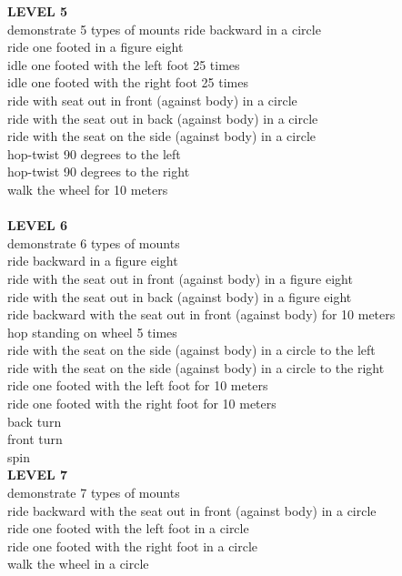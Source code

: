 \begin{multicols}{2}
\textbf{LEVEL 5}\\
demonstrate 5 types of mounts ride backward in a circle\\
ride one footed in a figure eight\\
idle one footed with the left foot 25 times\\
idle one footed with the right foot 25 times\\
ride with seat out in front (against body) in a circle\\
ride with the seat out in back (against body) in a circle\\
ride with the seat on the side (against body) in a circle\\
hop-twist 90 degrees to the left\\
hop-twist 90 degrees to the right\\
walk the wheel for 10 meters \\
\\
\textbf{LEVEL 6}\\
demonstrate 6 types of mounts\\
ride backward in a figure eight\\
ride with the seat out in front (against body) in a figure eight\\
ride with the seat out in back (against body) in a figure eight\\
ride backward with the seat out in front (against body) for 10 meters\\
hop standing on wheel 5 times\\
ride with the seat on the side (against body) in a circle to the left\\
ride with the seat on the side (against body) in a circle to the right\\
ride one footed with the left foot for 10 meters\\
ride one footed with the right foot for 10 meters\\
back turn\\
front turn\\
spin \\
\newpage
\textbf{LEVEL 7}\\
demonstrate 7 types of mounts\\
ride backward with the seat out in front (against body) in a circle\\
ride one footed with the left foot in a circle\\
ride one footed with the right foot in a circle\\
walk the wheel in a circle\\

\end{multicols}
